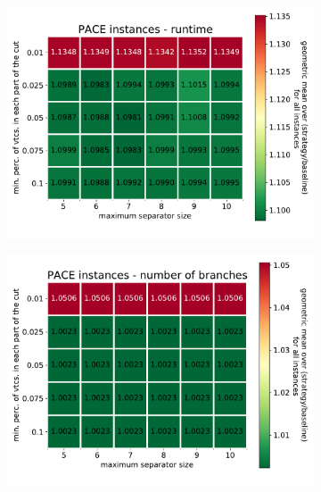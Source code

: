 \documentclass[12pt,a4paper,twoside]{scrartcl}
\numberwithin{equation}{section}
\begin{document}
\begin{figure}[htb!]
	\centering	
	\begin{subfigure}{0.475\textwidth}
		\includegraphics[width=\textwidth]{images/plots/st_tune_pace_t}
	\end{subfigure}
	\begin{subfigure}{0.475\textwidth}
		\includegraphics[width=\textwidth]{images/plots/st_tune_pace_b}
	\end{subfigure}
	

\end{figure}
\end{document}
